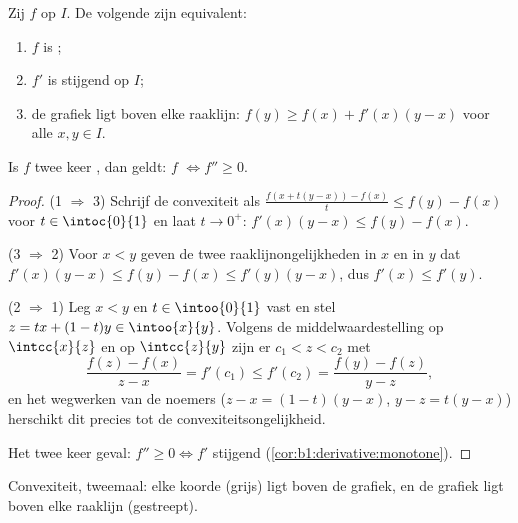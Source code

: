 \begin{theorem}\label{thm:b1:derivative:convexchar}
Zij $f$  op $I$. De volgende  zijn equivalent:
\begin{enumerate}
  \item $f$ is ;
  \item $f'$ is stijgend op $I$;
  \item de grafiek ligt boven elke raaklijn: $f(y) \geq f(x) +
        f'(x)(y - x)$ voor alle $x, y \in I$.
\end{enumerate}
Is $f$ twee keer , dan geldt: $f$  $\iff f'' \geq 0$.
\end{theorem}

\begin{proof}
(1 $\Rightarrow$ 3) Schrijf de convexiteit als $\frac{f(x + t(y-x)) -
f(x)}{t} \leq f(y) - f(x)$ voor $t \in \intoc{0}{1}$ en laat $t \to
0^+$: $f'(x)(y - x) \leq f(y) - f(x)$.

(3 $\Rightarrow$ 2) Voor $x < y$ geven de twee
raaklijnongelijkheden in $x$ en in $y$ dat $f'(x)(y-x) \leq f(y) -
f(x) \leq f'(y)(y - x)$, dus $f'(x) \leq f'(y)$.

(2 $\Rightarrow$ 1) Leg $x < y$ en $t \in \intoo{0}{1}$ vast en stel
$z = tx + (1-t)y \in \intoo{x}{y}$. Volgens de middelwaardestelling
op $\intcc{x}{z}$ en op $\intcc{z}{y}$ zijn er $c_1 < z < c_2$ met
\[
\frac{f(z) - f(x)}{z - x} = f'(c_1) \leq f'(c_2)
= \frac{f(y) - f(z)}{y - z} ,
\]
en het wegwerken van de noemers ($z - x = (1-t)(y-x)$, $y - z =
t(y-x)$) herschikt dit precies tot de convexiteitsongelijkheid.

Het twee keer  geval: $f'' \geq 0 \iff f'$ stijgend
(\cref{cor:b1:derivative:monotone}).
\end{proof}

\begin{omfigure}

{\small Convexiteit, tweemaal: elke koorde (grijs) ligt boven de
grafiek, en de grafiek ligt boven elke raaklijn (gestreept).}
\end{omfigure}

